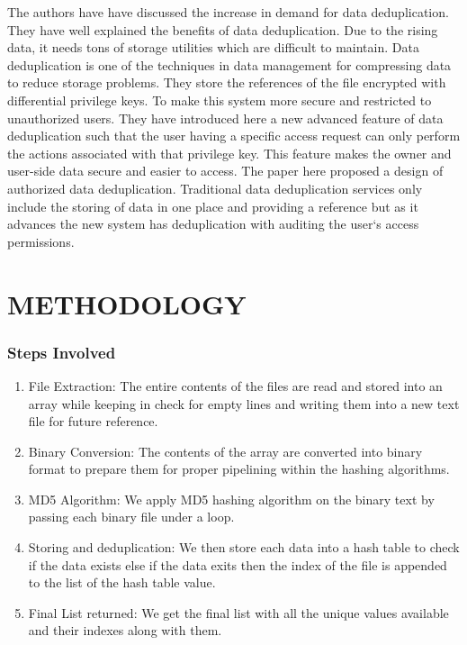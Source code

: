 \documentclass[%
 aip,
cp,  %
 amsmath,amssymb,%
 reprint,%
]{revtex4-2}
\begin{document}
The authors have \cite{kp} have discussed the increase in demand for data deduplication. They have well explained the benefits of data deduplication. Due to the rising data, it needs tons of storage utilities which are difficult to maintain. Data deduplication is one of the techniques in data management for compressing data to reduce storage problems. They store the references of the file encrypted with differential privilege keys. To make this system more secure and restricted to unauthorized users. They have introduced here a new advanced feature of data deduplication such that the user having a specific access request can only perform the actions associated with that privilege key. This feature makes the owner and user-side data secure and easier to access. The paper here proposed a design of authorized data deduplication. Traditional data deduplication services only include the storing of data in one place and providing a reference but as it advances the new system has deduplication with auditing the user`s access permissions.

\section{\label{sec:methodology}METHODOLOGY}

\subsubsection{\label{sec:steps}Steps Involved }
\begin{enumerate}
\item {File Extraction: 
The entire contents of the files are read and stored into an array while keeping in check for empty lines and writing them into a new text file for future reference.}
\item{Binary Conversion: 
The contents of the array are converted into binary format to prepare them for proper pipelining within the hashing algorithms.}
\item{MD5 Algorithm: 
We apply MD5 hashing algorithm on the binary text by passing each binary file under a loop.}
\item{Storing and deduplication: 
We then store each data into a hash table to check if the data exists else if the data exits then the index of the file is appended to the list of the hash table value.}
\item{Final List returned: 
We get the final list with all the unique values available and their indexes along with them.}
\end{enumerate}
\end{document}
